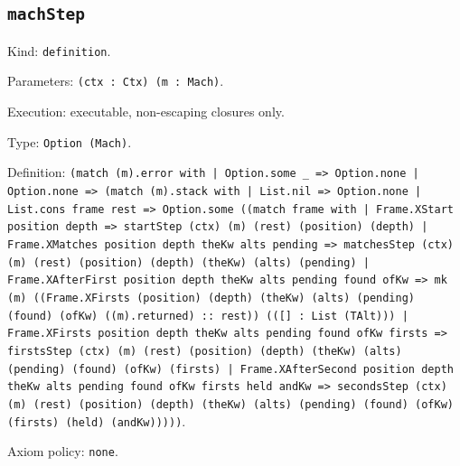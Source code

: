 \documentclass[11pt]{article}
\begin{document}
\subsection*{\texttt{machStep}}
\noindent Kind: \texttt{definition}.\par
\noindent Parameters: \texttt{(ctx : Ctx) (m : Mach)}.\par
\noindent Execution: executable, non-escaping closures only.\par
\noindent Type: \texttt{Option (Mach)}.\par
\noindent Definition: \texttt{(match (m).error with | Option.some \_ => Option.none | Option.none => (match (m).stack with | List.nil => Option.none | List.cons frame rest => Option.some ((match frame with | Frame.XStart position depth => startStep (ctx) (m) (rest) (position) (depth) | Frame.XMatches position depth theKw alts pending => matchesStep (ctx) (m) (rest) (position) (depth) (theKw) (alts) (pending) | Frame.XAfterFirst position depth theKw alts pending found ofKw => mk (m) ((Frame.XFirsts (position) (depth) (theKw) (alts) (pending) (found) (ofKw) ((m).returned) :: rest)) (([] : List (TAlt))) | Frame.XFirsts position depth theKw alts pending found ofKw firsts => firstsStep (ctx) (m) (rest) (position) (depth) (theKw) (alts) (pending) (found) (ofKw) (firsts) | Frame.XAfterSecond position depth theKw alts pending found ofKw firsts held andKw => secondsStep (ctx) (m) (rest) (position) (depth) (theKw) (alts) (pending) (found) (ofKw) (firsts) (held) (andKw)))))}.\par
\noindent Axiom policy: \texttt{none}.\par
\end{document}

